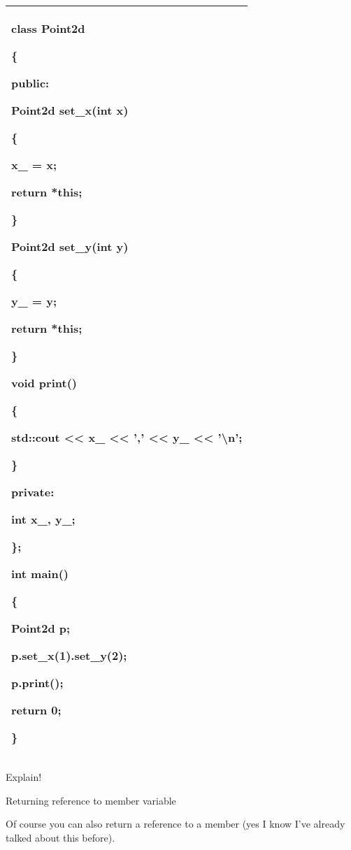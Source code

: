 \documentclass[
]{article}
\begin{document}
\begin{longtable}[]{@{}l@{}}
\toprule
\endhead
\begin{minipage}[t]{0.97\columnwidth}\raggedright
class Point2d

\{

public:

\textbf{Point2d} set\_x(int x)

\{

x\_ = x;

return *this;

\}

\textbf{Point2d} set\_y(int y)

\{

y\_ = y;

return *this;

\}

void print()

\{

std::cout \textless\textless{} x\_ \textless\textless{} ','
\textless\textless{} y\_ \textless\textless{} '\textbackslash n';

\}

private:

int x\_, y\_;

\};

int main()

\{

Point2d p;

p.set\_x(1).set\_y(2);

p.print();

return 0;

\}\strut
\end{minipage}\tabularnewline
\bottomrule
\end{longtable}

Explain!

Returning reference to member variable

Of course you can also return a reference to a member (yes I know I've
already talked about this before).
\end{document}
